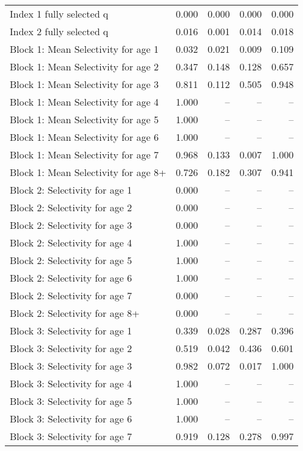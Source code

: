 \documentclass[
]{article}
\begin{document}
\begin{landscape}
\begin{longtable}[t]{lrrrr}
\endfoot
\bottomrule
\endlastfoot
Index 1 fully selected q & 0.000 & 0.000 & 0.000 & 0.000\\
Index 2 fully selected q & 0.016 & 0.001 & 0.014 & 0.018\\
Block 1: Mean Selectivity for age 1 & 0.032 & 0.021 & 0.009 & 0.109\\
Block 1: Mean Selectivity for age 2 & 0.347 & 0.148 & 0.128 & 0.657\\
Block 1: Mean Selectivity for age 3 & 0.811 & 0.112 & 0.505 & 0.948\\
\addlinespace
Block 1: Mean Selectivity for age 4 & 1.000 & -- & -- & --\\
Block 1: Mean Selectivity for age 5 & 1.000 & -- & -- & --\\
Block 1: Mean Selectivity for age 6 & 1.000 & -- & -- & --\\
Block 1: Mean Selectivity for age 7 & 0.968 & 0.133 & 0.007 & 1.000\\
Block 1: Mean Selectivity for age 8+ & 0.726 & 0.182 & 0.307 & 0.941\\
\addlinespace
Block 2: Selectivity for age 1 & 0.000 & -- & -- & --\\
Block 2: Selectivity for age 2 & 0.000 & -- & -- & --\\
Block 2: Selectivity for age 3 & 0.000 & -- & -- & --\\
Block 2: Selectivity for age 4 & 1.000 & -- & -- & --\\
Block 2: Selectivity for age 5 & 1.000 & -- & -- & --\\
\addlinespace
Block 2: Selectivity for age 6 & 1.000 & -- & -- & --\\
Block 2: Selectivity for age 7 & 0.000 & -- & -- & --\\
Block 2: Selectivity for age 8+ & 0.000 & -- & -- & --\\
Block 3: Selectivity for age 1 & 0.339 & 0.028 & 0.287 & 0.396\\
Block 3: Selectivity for age 2 & 0.519 & 0.042 & 0.436 & 0.601\\
\addlinespace
Block 3: Selectivity for age 3 & 0.982 & 0.072 & 0.017 & 1.000\\
Block 3: Selectivity for age 4 & 1.000 & -- & -- & --\\
Block 3: Selectivity for age 5 & 1.000 & -- & -- & --\\
Block 3: Selectivity for age 6 & 1.000 & -- & -- & --\\
Block 3: Selectivity for age 7 & 0.919 & 0.128 & 0.278 & 0.997\\

\end{longtable}
\end{landscape}
\end{document}
